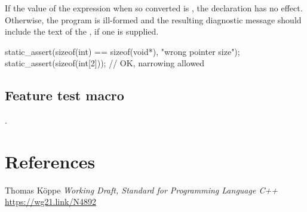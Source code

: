 \documentclass{wg21}
\begin{document}
If the value of the expression  when
so converted is , the declaration has no
effect.
Otherwise, the program is ill-formed and the resulting
diagnostic message should include the text of
the , if one is supplied.


\begin{example}
\begin{codeblock}
    static_assert(sizeof(int) == sizeof(void*), "wrong pointer size");
    static_assert(sizeof(int[2]));          // OK, narrowing allowed
\end{codeblock}
\end{example}



\subsection{Feature test macro}

.

\section{References}

\renewcommand{\section}[2]{}%



\begin{thebibliography}{9}

Thomas Köppe
\emph{Working Draft, Standard for Programming Language C++}\newline
\url{https://wg21.link/N4892}


\end{thebibliography}
\end{document}

